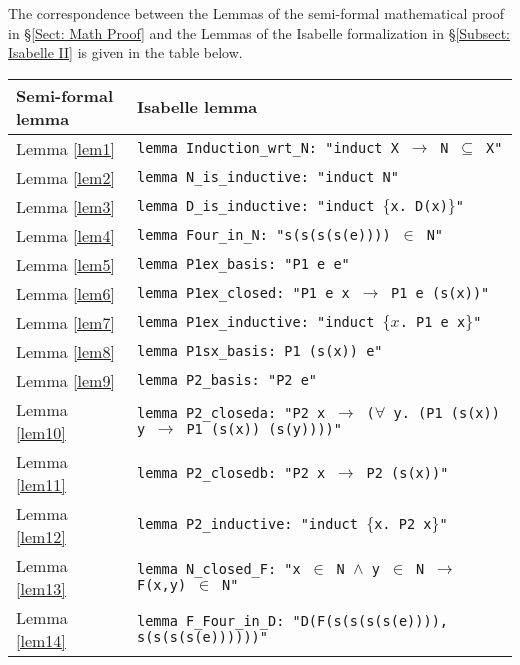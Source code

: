 \documentclass[11pt,a4paper]{article}
\newcommand{\bt}[2]{\small \begin{center}\begin{tabular}{p{#1 cm}p{#2 cm}}}
\def\et{\end{tabular}\end{center}\normalsize}
\theoremstyle{definition}
\begin{document}
The correspondence between the Lemmas of the semi-formal mathematical proof in \S \ref{Sect: Math Proof} and the Lemmas of the Isabelle formalization in \S \ref{Subsect: Isabelle II} is given in the table below.

\bt{3}{13.5}
Semi-formal lemma & Isabelle lemma\\
\hline
Lemma \ref{lem1} & \texttt{lemma Induction\_wrt\_N: "induct X $\longrightarrow$ N $\subseteq$ X"} \\
Lemma \ref{lem2} & \texttt{lemma N\_is\_inductive: "induct N"}\\
Lemma \ref{lem3} & \texttt{lemma D\_is\_inductive: "induct $\{$x. D(x)$\}$"} \\
Lemma \ref{lem4} & \texttt{lemma Four\_in\_N: "s(s(s(s(e)))) $\in$ N"} \\
Lemma \ref{lem5} & \texttt{lemma P1ex\_basis: "P1 e e"} \\
Lemma \ref{lem6} & \texttt{lemma P1ex\_closed: "P1 e x $\longrightarrow$ P1 e (s(x))"}\\
Lemma \ref{lem7} & \texttt{lemma P1ex\_inductive: "induct $\{x$. P1 e x$\}$"} \\
Lemma \ref{lem8} & \texttt{lemma P1sx\_basis: P1 (s(x)) e"} \\
Lemma \ref{lem9} & \texttt{lemma P2\_basis: "P2 e"} \\
Lemma \ref{lem10} & \texttt{lemma P2\_closeda: "P2 x $\longrightarrow$ ($\forall$ y. (P1 (s(x)) y $\longrightarrow$ P1 (s(x)) (s(y))))"} \\
Lemma \ref{lem11} & \texttt{lemma P2\_closedb: "P2 x $\longrightarrow$ P2 (s(x))"} \\ 
Lemma \ref{lem12} & \texttt{lemma P2\_inductive: "induct $\{$x. P2 x$\}$"} \\ 
Lemma \ref{lem13} & \texttt{lemma N\_closed\_F: "x $\in$ N $\wedge$ y $\in$ N $\longrightarrow$ F(x,y) $\in$ N"} \\
Lemma \ref{lem14} & \texttt{lemma F\_Four\_in\_D: "D(F(s(s(s(s(e)))), s(s(s(s(e))))))"} 
\et






\end{document}
